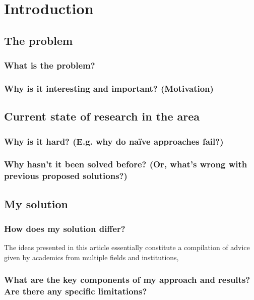 \chapter{Introduction}

\section{The problem}

\subsection{What is the problem?}

\subsection{Why is it interesting and important? (Motivation)}

\section{Current state of research in the area}

\subsection{Why is it hard? (E.g. why do naïve approaches fail?)}

\subsection{Why hasn’t it been solved before? (Or, what’s wrong with previous proposed solutions?)}

\section{My solution}

\subsection{How does my solution differ?}
The ideas presented in this article essentially constitute a compilation of advice given by academics from multiple fields and institutions,

\subsection{What are the key components of my approach and results? Are there any specific limitations?}

